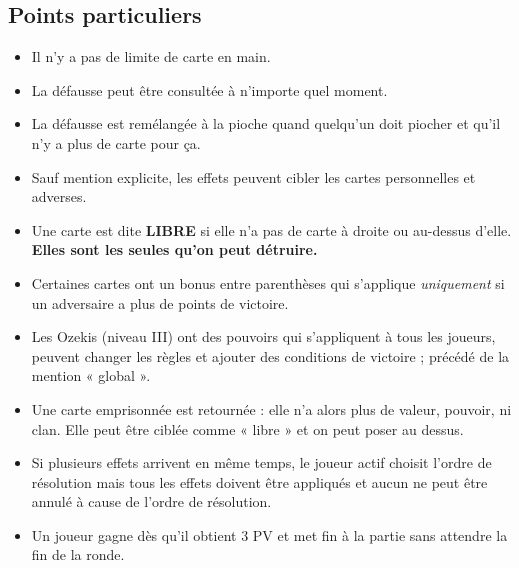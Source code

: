 \documentclass[10pt, a4paper]{article}	%
\begin{document}
\begin{multicols}{3}
\section{Points particuliers}
\label{sec:points_particuliers}
\begin{itemize}
\item Il n'y a pas de limite de carte en main.
\item La défausse peut être consultée à n'importe quel moment.
\item La défausse est remélangée à la pioche quand quelqu'un doit piocher et qu'il n'y a plus de carte pour ça.
\item Sauf mention explicite, les effets peuvent cibler les cartes personnelles et adverses.
\item Une carte est dite \textbf{LIBRE} si elle n'a pas de carte à droite ou au-dessus d'elle. \\ \textbf{Elles sont les seules qu'on peut détruire.}
\item Certaines cartes ont un bonus entre parenthèses qui s'applique \textit{uniquement} si un adversaire a plus de points de victoire.
\item Les Ozekis (niveau III) ont des pouvoirs qui s'appliquent à tous les joueurs, peuvent changer les règles et ajouter des conditions de victoire ; précédé de la mention « global ».
\item Une carte emprisonnée est retournée : elle n'a alors plus de valeur, pouvoir, ni clan. Elle peut être ciblée comme « libre » et on peut poser au dessus.
\item Si plusieurs effets arrivent en même temps, le joueur actif choisit l'ordre de résolution mais tous les effets doivent être appliqués et aucun ne peut être annulé à cause de l'ordre de résolution.
\item Un joueur gagne dès qu'il obtient 3 PV et met fin à la partie sans attendre la fin de la ronde.
\end{itemize}



\end{multicols}
\end{document}
